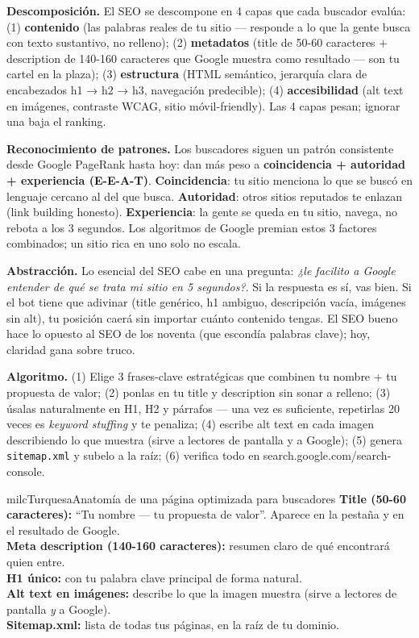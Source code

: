 \documentclass[11pt,letterpaper]{article}
\newcommand{\milcpaso}[3]{%
\Needspace{4\baselineskip}%
\begin{tcolorbox}[enhanced,colback=white,colframe=milcLinea,arc=1.5mm,boxrule=.9pt,
  left=14mm,right=4mm,top=3mm,bottom=3mm,before skip=4pt,after skip=4pt,
  fontupper=\RaggedRight,
  overlay={\node[anchor=north west,circle,fill=#2,text=white,inner sep=0pt,
    minimum size=7.4mm,font=\sffamily\bfseries\small]
    at ([xshift=3.6mm,yshift=-3.2mm]frame.north west) {#1};}]
#3
\end{tcolorbox}}
\begin{document}
\milcpaso{1}{milcTurquesa}{\textbf{Descomposición.} El SEO se descompone en 4 capas que cada buscador evalúa: (1) \textbf{contenido} (las palabras reales de tu sitio --- responde a lo que la gente busca con texto sustantivo, no relleno); (2) \textbf{metadatos} (title de 50-60 caracteres + description de 140-160 caracteres que Google muestra como resultado --- son tu cartel en la plaza); (3) \textbf{estructura} (HTML semántico, jerarquía clara de encabezados h1 → h2 → h3, navegación predecible); (4) \textbf{accesibilidad} (alt text en imágenes, contraste WCAG, sitio móvil-friendly). Las 4 capas pesan; ignorar una baja el ranking.}
\milcpaso{2}{milcTurquesa}{\textbf{Reconocimiento de patrones.} Los buscadores siguen un patrón consistente desde Google PageRank hasta hoy: dan más peso a \textbf{coincidencia + autoridad + experiencia (E-E-A-T)}. \textbf{Coincidencia}: tu sitio menciona lo que se buscó en lenguaje cercano al del que busca. \textbf{Autoridad}: otros sitios reputados te enlazan (link building honesto). \textbf{Experiencia}: la gente se queda en tu sitio, navega, no rebota a los 3 segundos. Los algoritmos de Google premian estos 3 factores combinados; un sitio rica en uno solo no escala.}
\milcpaso{3}{milcTurquesa}{\textbf{Abstracción.} Lo esencial del SEO cabe en una pregunta: \emph{¿le facilito a Google entender de qué se trata mi sitio en 5 segundos?}. Si la respuesta es sí, vas bien. Si el bot tiene que adivinar (title genérico, h1 ambiguo, descripción vacía, imágenes sin alt), tu posición caerá sin importar cuánto contenido tengas. El SEO bueno hace lo opuesto al SEO de los noventa (que escondía palabras clave); hoy, claridad gana sobre truco.}
\milcpaso{4}{milcTurquesa}{\textbf{Algoritmo.} (1) Elige 3 frases-clave estratégicas que combinen tu nombre + tu propuesta de valor; (2) ponlas en tu title y description sin sonar a relleno; (3) úsalas naturalmente en H1, H2 y párrafos --- una vez es suficiente, repetirlas 20 veces es \emph{keyword stuffing} y te penaliza; (4) escribe alt text en cada imagen describiendo lo que muestra (sirve a lectores de pantalla y a Google); (5) genera \texttt{sitemap.xml} y subelo a la raíz; (6) verifica todo en search.google.com/search-console.}

\begin{drawbox}{milcTurquesa}{Anatomía de una página optimizada para buscadores}
\textbf{Title (50-60 caracteres):} ``Tu nombre --- tu propuesta de valor''. Aparece en la pestaña y en el resultado de Google. \\[1mm] \textbf{Meta description (140-160 caracteres):} resumen claro de qué encontrará quien entre. \\[1mm] \textbf{H1 único:} con tu palabra clave principal de forma natural. \\[1mm] \textbf{Alt text en imágenes:} describe lo que la imagen muestra (sirve a lectores de pantalla \emph{y} a Google). \\[1mm] \textbf{Sitemap.xml:} lista de todas tus páginas, en la raíz de tu dominio.
\end{drawbox}
\end{document}

